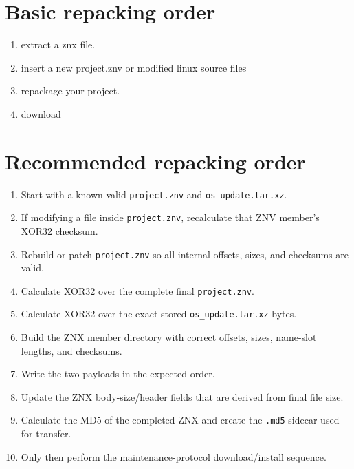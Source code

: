 \documentclass[]{article}
\begin{document}
\section{Basic repacking order}
\begin{enumerate}
\item extract a znx file.
\item insert a new project.znv or modified linux source files
\item repackage your project.
\item download

\end{enumerate}

\section{Recommended repacking order}
\begin{enumerate}
    \item Start with a known-valid \texttt{project.znv} and
          \texttt{os\_update.tar.xz}.

    \item If modifying a file inside \texttt{project.znv}, recalculate that
          ZNV member's XOR32 checksum.

    \item Rebuild or patch \texttt{project.znv} so all internal offsets,
          sizes, and checksums are valid.

    \item Calculate XOR32 over the complete final \texttt{project.znv}.

    \item Calculate XOR32 over the exact stored
          \texttt{os\_update.tar.xz} bytes.

    \item Build the ZNX member directory with correct offsets, sizes,
          name-slot lengths, and checksums.

    \item Write the two payloads in the expected order.

    \item Update the ZNX body-size/header fields that are derived from
          final file size.

    \item Calculate the MD5 of the completed ZNX and create the
          \texttt{.md5} sidecar used for transfer.

    \item Only then perform the maintenance-protocol download/install
          sequence.
\end{enumerate}
\end{document}
